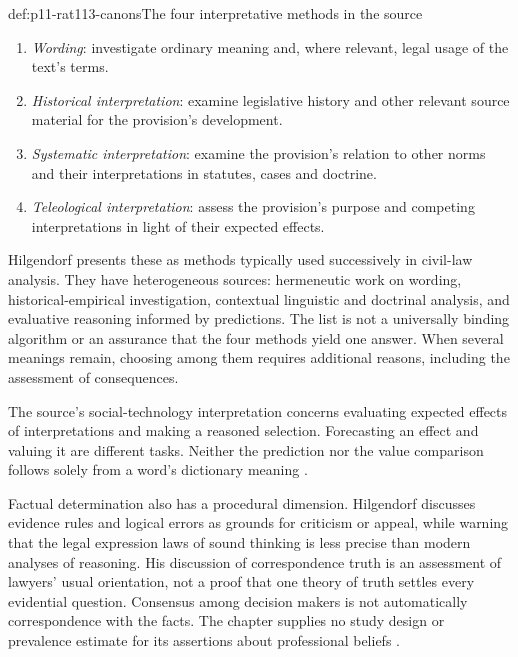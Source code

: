 \begin{hbmethod}{def:p11-rat113-canons}{The four interpretative methods in the source}
\begin{enumerate}
\item \emph{Wording}: investigate ordinary meaning and, where relevant,
      legal usage of the text's terms.
\item \emph{Historical interpretation}: examine legislative history and
      other relevant source material for the provision's development.
\item \emph{Systematic interpretation}: examine the provision's relation
      to other norms and their interpretations in statutes, cases and doctrine.
\item \emph{Teleological interpretation}: assess the provision's purpose
      and competing interpretations in light of their expected effects.
\end{enumerate}
Hilgendorf presents these as methods typically used successively in civil-law
analysis. They have heterogeneous sources: hermeneutic work on wording,
historical-empirical investigation, contextual linguistic and doctrinal
analysis, and evaluative reasoning informed by predictions. The list is not
a universally binding algorithm or an assurance that the four methods yield
one answer. When several meanings remain, choosing among them requires
additional reasons, including the assessment of consequences.
\end{hbmethod}

The source's social-technology interpretation concerns evaluating expected
effects of interpretations and making a reasoned selection. Forecasting an
effect and valuing it are different tasks. Neither the prediction nor the
value comparison follows solely from a word's dictionary meaning
\parencite[pp.~662--663, note~18 on p.~665]{Hilgendorf2021LegalLogic}.

Factual determination also has a procedural dimension. Hilgendorf discusses
evidence rules and logical errors as grounds for criticism or appeal, while
warning that the legal expression laws of sound thinking is less precise
than modern analyses of reasoning. His discussion of correspondence truth
is an assessment of lawyers' usual orientation, not a proof that one theory
of truth settles every evidential question. Consensus among decision makers
is not automatically correspondence with the facts. The chapter supplies no
study design or prevalence estimate for its assertions about professional
beliefs \parencite[p.~660, notes~7--8 on p.~665]{Hilgendorf2021LegalLogic}.

